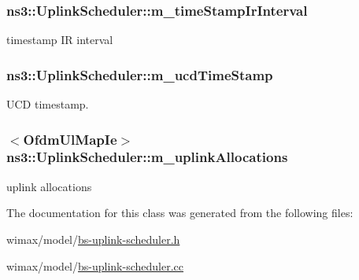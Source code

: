 \subsubsection[{\texorpdfstring{m\+\_\+time\+Stamp\+Ir\+Interval}{m_timeStampIrInterval}}]{ ns3\+::\+Uplink\+Scheduler\+::m\+\_\+time\+Stamp\+Ir\+Interval\hspace{0.3cm}{\ttfamily [private]}}\hypertarget{classns3_1_1UplinkScheduler_a5660e17dc4bb21effdd480fa97644311}{}\label{classns3_1_1UplinkScheduler_a5660e17dc4bb21effdd480fa97644311}


timestamp IR interval 

\subsubsection[{\texorpdfstring{m\+\_\+ucd\+Time\+Stamp}{m_ucdTimeStamp}}]{ ns3\+::\+Uplink\+Scheduler\+::m\+\_\+ucd\+Time\+Stamp\hspace{0.3cm}{\ttfamily [private]}}\hypertarget{classns3_1_1UplinkScheduler_a38eac03099707e8418c3f73741e47e57}{}\label{classns3_1_1UplinkScheduler_a38eac03099707e8418c3f73741e47e57}


U\+CD timestamp. 

\subsubsection[{\texorpdfstring{m\+\_\+uplink\+Allocations}{m_uplinkAllocations}}]{$<${\bf Ofdm\+Ul\+Map\+Ie}$>$ ns3\+::\+Uplink\+Scheduler\+::m\+\_\+uplink\+Allocations\hspace{0.3cm}{\ttfamily [private]}}\hypertarget{classns3_1_1UplinkScheduler_a46f2984afe126cbcf862e49b53700fdf}{}\label{classns3_1_1UplinkScheduler_a46f2984afe126cbcf862e49b53700fdf}


uplink allocations 



The documentation for this class was generated from the following files\+:\begin{DoxyCompactItemize}
\item 
wimax/model/\hyperlink{bs-uplink-scheduler_8h}{bs-\/uplink-\/scheduler.\+h}\item 
wimax/model/\hyperlink{bs-uplink-scheduler_8cc}{bs-\/uplink-\/scheduler.\+cc}\end{DoxyCompactItemize}
